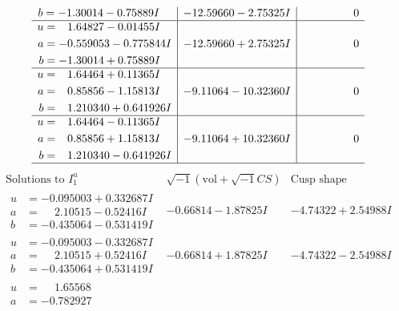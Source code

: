 \documentclass[1p]{elsarticle_modified}
\theoremstyle{definition}
\newcommand{\I}{\sqrt{-1}}
\begin{document}
$$\begin{array}{c|c|c}
\begin{aligned}
b &= -1.30014 - 0.75889 I\end{aligned}
 & -12.59660 - 2.75325 I & \phantom{-0.000000 } 0 \\ \hline\begin{aligned}
u &= \phantom{-}1.64827 - 0.01455 I \\
a &= -0.559053 - 0.775844 I \\
b &= -1.30014 + 0.75889 I\end{aligned}
 & -12.59660 + 2.75325 I & \phantom{-0.000000 } 0 \\ \hline\begin{aligned}
u &= \phantom{-}1.64464 + 0.11365 I \\
a &= \phantom{-}0.85856 - 1.15813 I \\
b &= \phantom{-}1.210340 + 0.641926 I\end{aligned}
 & -9.11064 - 10.32360 I & \phantom{-0.000000 } 0 \\ \hline\begin{aligned}
u &= \phantom{-}1.64464 - 0.11365 I \\
a &= \phantom{-}0.85856 + 1.15813 I \\
b &= \phantom{-}1.210340 - 0.641926 I\end{aligned}
 & -9.11064 + 10.32360 I & \phantom{-0.000000 } 0\\
 \hline 
 \end{array}$$\newpage$$\begin{array}{c|c|c}  
\text{Solutions to }I^u_{1}& \I (\text{vol} + \sqrt{-1}CS) & \text{Cusp shape}\\
 \hline 
\begin{aligned}
u &= -0.095003 + 0.332687 I \\
a &= \phantom{-}2.10515 - 0.52416 I \\
b &= -0.435064 - 0.531419 I\end{aligned}
 & -0.66814 - 1.87825 I & -4.74322 + 2.54988 I \\ \hline\begin{aligned}
u &= -0.095003 - 0.332687 I \\
a &= \phantom{-}2.10515 + 0.52416 I \\
b &= -0.435064 + 0.531419 I\end{aligned}
 & -0.66814 + 1.87825 I & -4.74322 - 2.54988 I \\ \hline\begin{aligned}
u &= \phantom{-}1.65568\phantom{ +0.000000I} \\
a &= -0.782927\phantom{ +0.000000I} \\

\end{aligned}
\end{array}$$
\end{document}
